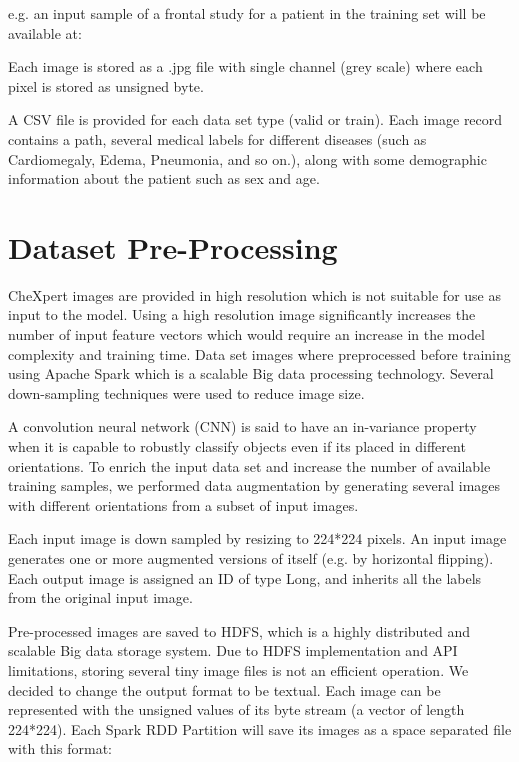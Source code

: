 \documentclass{amia}
\begin{document}
e.g. an input sample of a frontal study for a patient in the training set will be available at:


Each image is stored as a .jpg file with single channel (grey scale) where each pixel is stored as unsigned byte.

A CSV file is provided for each data set type (valid or train). Each image record contains a path, several medical labels for different diseases (such as Cardiomegaly, Edema, Pneumonia, and so on.), along with some demographic information about the patient such as sex and age.


\section*{Dataset Pre-Processing}

CheXpert\cite{ref2} images are provided in high resolution which is not suitable for use as input to the model. Using a high resolution image significantly increases the number of input feature vectors which would require an increase in the model complexity and training time. Data set images where preprocessed before training using Apache Spark which is a scalable Big data processing technology. Several down-sampling techniques were used to reduce image size.

A convolution neural network (CNN) is said to have an in-variance property when it is capable to robustly classify objects even if its placed in different orientations. To enrich the input data set and increase the number of available training samples, we performed data augmentation by generating several images with different orientations from a subset of input images.

Each input image is down sampled by resizing to 224*224 pixels. An input image generates one or more augmented versions of itself (e.g. by horizontal flipping). Each output image is assigned an ID of type Long, and inherits all the labels from the original input image.

Pre-processed images are saved to HDFS, which is a highly distributed and scalable Big data storage system. Due to HDFS implementation and API limitations, storing several tiny image files is not an efficient operation.
We decided to change the output format to be textual. Each image can be represented with the unsigned values of its byte stream (a vector of length 224*224). Each Spark RDD Partition will save its images as a space separated file with this format:
\end{document}
